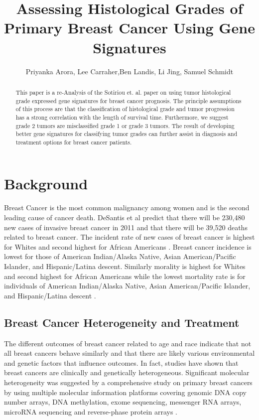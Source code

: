 \documentclass[a4paper,10pt]{article}
\title{Assessing Histological Grades of Primary Breast Cancer Using Gene Signatures}
\author{Priyanka Arora, Lee Carraher,Ben Landis, Li Jing, Samuel Schmidt}
\begin{document}
\maketitle

\begin{abstract}
This paper is a re-Analysis of the Sotiriou et. al. paper on using tumor 
histological grade expressed gene signatures for breast cancer 
prognosis\cite{Sotiriou}. The principle assumptions of this process are that
the classification of histological grade and tumor progression has a strong 
correlation with the length of survival time. Furthermore, we suggest grade 2
tumors are misclassified grade 1 or grade 3 tumors. The result of developing 
better gene signatures for classifying tumor grades can further
assist in diagnosis and treatment options for breast cancer patients.


\end{abstract}


\section{Background}   
Breast Cancer is the most common malignancy among women and is the second 
leading cause of cancer death. DeSantis et al predict that there will be 230,480 
new cases of invasive breast cancer in 2011 and that there will be 39,520 deaths 
related to breast cancer.  The incident rate of new cases of breast cancer is highest 
for Whites and second highest for African Americans \cite{henderson1}.  Breast cancer incidence is lowest for those of American Indian/Alaska Native, 
Asian American/Pacific Islander, and Hispanic/Latina descent.  Similarly morality is 
highest for Whites and second highest for African Americans while the lowest mortality 
rate is for individuals of American Indian/Alaska Native, Asian American/Pacific Islander, 
and Hispanic/Latina descent \cite{henderson1}. \\
\subsection{Breast Cancer Heterogeneity and Treatment} 
The different outcomes of breast cancer related to age and race indicate that not all 
breast cancers behave similarly and that there are likely various environmental and 
genetic factors that influence outcomes.  In fact, studies have shown that breast 
cancers are clinically and genetically heterogeneous\cite{desantis1}. Significant 
molecular heterogeneity was suggested by a comprehensive study on primary breast 
cancers by using multiple molecular information platforms covering genomic DNA 
copy number arrays, DNA methylation, exome sequencing, messenger RNA arrays, 
microRNA sequencing and reverse-phase protein arrays \cite{Nature1}. \\
\end{document}
